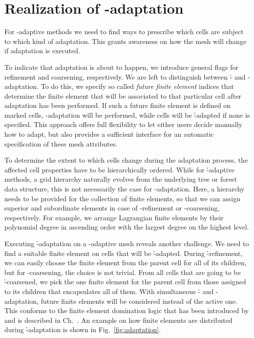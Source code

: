 \section{Realization of \hp-adaptation}
\label{sec:adaptation}

For \hp{}-adaptive methods we need to find ways to prescribe which cells are subject to which kind of adaptation. This grants awareness on how the mesh will change if adaptation is executed.

To indicate that adaptation is about to happen, we introduce general flags for refinement and coarsening, respectively. We are left to distinguish between \h- and \p-adaptation. To do this, we specify so called \textit{future finite element} indices that determine the finite element that will be associated to that particular cell after adaptation has been performed. If such a future finite element is defined on marked cells, \p-adaptation will be performed, while cells will be \h-adapted if none is specified. This approach offers full flexibility to let either users decide manually how to adapt, but also provides a sufficient interface for an automatic specification of these mesh attributes.

To determine the extent to which cells change during the adaptation process, the affected cell properties have to be hierarchically ordered. While for \h-adaptive methods, a grid hierarchy naturally evolves from the underlying tree or forest data structure, this is not necessarily the case for \p-adaptation. Here, a hierarchy needs to be provided for the collection of finite elements, so that we can assign superior and subordinate elements in case of \p-refinement or \p-coarsening, respectively. For example, we arrange Lagrangian finite elements by their polynomial degree in ascending order with the largest degree on the highest level.

Executing \h-adaptation on a \p-adaptive mesh reveals another challenge. We need to find a suitable finite element on cells that will be \h-adapted. During \h-refinement, we can easily choose the finite element from the parent cell for all of its children, but for \p-coarsening, the choice is not trivial. From all cells that are going to be \h-coarsened, we pick the one finite element for the parent cell from those assigned to its children that encapsulates all of them. With simultaneous \h- and \p-adaptation, future finite elements will be considered instead of the active one. This conforms to the finite element domination logic that has been introduced by \textcite{bangerth2009} and is described in Ch.~. An example on how finite elements are distributed during \h-adaptation is shown in Fig.~\ref{fig:adaptation}.


